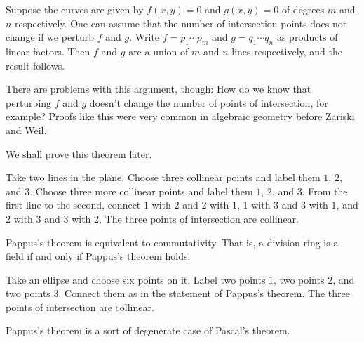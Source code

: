\documentclass[11pt, oneside,margin=1in]{article}
\begin{document}
Suppose the curves are given by $f(x,y)=0$ and $g(x,y)=0$ of degrees $m$ and $n$ respectively. One can assume that the number of intersection points does not change if we perturb $f$ and $g$. Write $f=p_1\cdots p_m$ and $g = q_1\cdots q_n$ as products of linear factors. Then $f$ and $g$ are a union of $m$ and $n$ lines respectively, and the result follows.

There are problems with this argument, though: How do we know that perturbing $f$ and $g$ doesn't change the number of points of intersection, for example? Proofs like this were very common in algebraic geometry before Zariski and Weil.

We shall prove this theorem later.

\begin{theorem}[Pappus]\label{}\text{}
Take two lines in the plane. Choose three collinear points and label them $1$, $2$, and $3$. Choose three more collinear points and label them $1$, $2$, and $3$. From the first line to the second, connect $1$ with $2$ and $2$ with $1$, $1$ with $3$ and $3$ with $1$, and $2$ with $3$ and $3$ with $2$. The three points of intersection are collinear.
\end{theorem}

\begin{remark}
	Pappus's theorem is equivalent to commutativity. That is, a division ring is a field if and only if Pappus's theorem holds.
\end{remark}

\begin{theorem}[Pascal]\label{}\text{}
Take an ellipse and choose six points on it. Label two points $1$, two points $2$, and two points $3$. Connect them as in the statement of Pappus's theorem. The three points of intersection are collinear. 
\end{theorem}

\begin{remark}
	Pappus's theorem is a sort of degenerate case of Pascal's theorem.
\end{remark}
\end{document}
